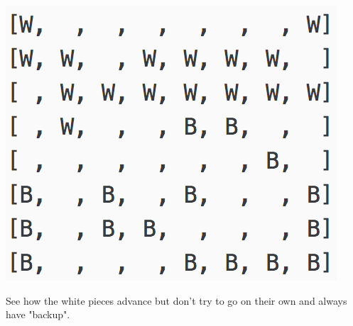 \documentclass[11pt]{article}
\begin{document}
\begin{center}
\includegraphics[scale=1]{part2/ab-o2-vs-ab-d1-pattern.png}
\end{center}
See how the white pieces advance but don't try to go on their own and always have "backup".\\
\end{document}
